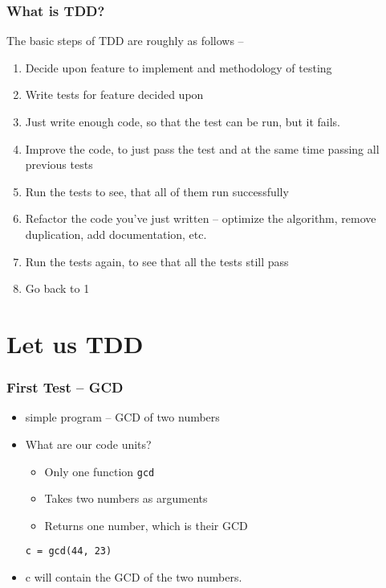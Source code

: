 \documentclass[14pt,compress]{beamer}
\begin{document}
\begin{frame}[plain]
  \frametitle{What is TDD?}
  \small

  The basic steps of TDD are roughly as follows --
  \begin{enumerate}
  \item<1-> Decide upon feature to implement and methodology of
    testing
  \item<2-> Write tests for feature decided upon
  \item<3-> Just write enough code, so that the test can be run, but it fails.
  \item<4-> Improve the code, to just pass the test and at the same time
    passing all previous tests
  \item<5-> Run the tests to see, that all of them run successfully
  \item<6-> Refactor the code you've just written -- optimize the algorithm,
    remove duplication, add documentation, etc.
  \item<7-> Run the tests again, to see that all the tests still pass
  \item<8-> Go back to 1
  \end{enumerate}
\end{frame}

\section{Let us TDD}

\begin{frame}[fragile]
  \frametitle{First Test -- GCD}
  \begin{itemize}
  \item simple program -- GCD of two numbers
  \item What are our code units?
    \begin{itemize}
    \item Only one function \texttt{gcd}
    \item Takes two numbers as arguments
    \item Returns one number, which is their GCD
    \end{itemize}
\begin{lstlisting}
c = gcd(44, 23)
\end{lstlisting}
  \item c will contain the GCD of the two numbers.
  \end{itemize}
\end{frame}
\end{document}
